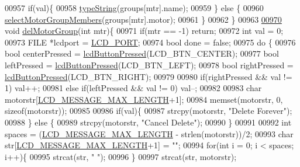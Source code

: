 \begin{DoxyCode}
{{{{{{{{{{{{{{00957     \textcolor{keywordflow}{if}(val)\{
00958         \hyperlink{lcddiag_8c_a17fe3ffc769a6d02c5226b3bfb79f28f}{typeString}(groups[mtr].name);
00959     \} \textcolor{keywordflow}{else} \{
00960         \hyperlink{lcddiag_8c_a72f3f96c95c24f67103b2eb30995dccb}{selectMotorGroupMembers}(groups[mtr].motor);
00961     \}
00962 \}
00963 
\hypertarget{lcddiag_8c_source.tex_l00970}{}\hyperlink{lcddiag_8c_ac1782b34157c340fc8ae576a55d7d067}{00970} \textcolor{keywordtype}{void} \hyperlink{lcddiag_8c_ac1782b34157c340fc8ae576a55d7d067}{delMotorGroup}(\textcolor{keywordtype}{int} mtr)\{
00971     \textcolor{keywordflow}{if}(mtr == -1) \textcolor{keywordflow}{return};
00972     \textcolor{keywordtype}{int} val = 0;
00973     FILE *lcdport = \hyperlink{lcdmsg_8h_abcf42bd88b3c36193f301ca25b033875}{LCD\_PORT};
00974     \textcolor{keywordtype}{bool} done = \textcolor{keyword}{false};
00975     \textcolor{keywordflow}{do} \{
00976         \textcolor{keywordtype}{bool} centerPressed = \hyperlink{lcddiag_8h_a74e4c744db49f9b7b645095575e152ad}{lcdButtonPressed}(LCD\_BTN\_CENTER);
00977         \textcolor{keywordtype}{bool} leftPressed = \hyperlink{lcddiag_8h_a74e4c744db49f9b7b645095575e152ad}{lcdButtonPressed}(LCD\_BTN\_LEFT);
00978         \textcolor{keywordtype}{bool} rightPressed = \hyperlink{lcddiag_8h_a74e4c744db49f9b7b645095575e152ad}{lcdButtonPressed}(LCD\_BTN\_RIGHT);
00979 
00980         \textcolor{keywordflow}{if}(rightPressed && val != 1) val++;
00981         \textcolor{keywordflow}{else} \textcolor{keywordflow}{if}(leftPressed && val != 0) val--;
00982 
00983         \textcolor{keywordtype}{char} motorstr[\hyperlink{lcdmsg_8h_abe4c4b70fc6f44ae3680e5b2c68cdd00}{LCD\_MESSAGE\_MAX\_LENGTH}+1];
00984         memset(motorstr, 0, \textcolor{keyword}{sizeof}(motorstr));
00985 
00986         \textcolor{keywordflow}{if}(val)\{
00987             strcpy(motorstr, \textcolor{stringliteral}{"Delete Forever"});
00988         \} \textcolor{keywordflow}{else} \{
00989             strcpy(motorstr, \textcolor{stringliteral}{"Cancel Delete"});
00990         \}
00991 
00992         \textcolor{keywordtype}{int} spaces = (\hyperlink{lcdmsg_8h_abe4c4b70fc6f44ae3680e5b2c68cdd00}{LCD\_MESSAGE\_MAX\_LENGTH} - strlen(motorstr))/2;
00993         \textcolor{keywordtype}{char} str[\hyperlink{lcdmsg_8h_abe4c4b70fc6f44ae3680e5b2c68cdd00}{LCD\_MESSAGE\_MAX\_LENGTH}+1] = \textcolor{stringliteral}{""};
00994         \textcolor{keywordflow}{for}(\textcolor{keywordtype}{int} i = 0; i < spaces; i++)\{
00995             strcat(str, \textcolor{stringliteral}{" "});
00996         \}
00997         strcat(str, motorstr);
}}}}}}}}}}}}}}
\end{DoxyCode}
